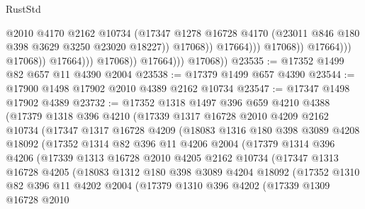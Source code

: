 \begin{lexlean}{RustStd}
\begin{coremodule}
                                                @2010
                                                @4170
                                                @2162
                                                @10734
                                                (@17347
                                                  @1278
                                                  @16728
                                                  @4170
                                                  (@23011 @846 @180 @398 @3629 @3250 @23020 @18227))
                                                @17068))
                                            @17664)))
                                      @17068))
                                  @17664)))
                            @17068))
                        @17664)))
                  @17068))
              @17664)))
        @17068))
@23535 := @17352 @1499 @82 @657 @11 @4390 @2004
@23538 := @17379 @1499 @657 @4390
@23544 := @17900 @1498 @17902 @2010 @4389 @2162 @10734
@23547 := @17347 @1498 @17902 @4389
@23732 := @17352
    @1318
    @1497
    @396
    @659
    @4210
    @4388
    (@17379
      @1318
      @396
      @4210
      (@17339
        @1317
        @16728
        @2010
        @4209
        @2162
        @10734
        (@17347
          @1317
          @16728
          @4209
          (@18083
            @1316
            @180
            @398
            @3089
            @4208
            @18092
            (@17352
              @1314
              @82
              @396
              @11
              @4206
              @2004
              (@17379
                @1314
                @396
                @4206
                (@17339
                  @1313
                  @16728
                  @2010
                  @4205
                  @2162
                  @10734
                  (@17347
                    @1313
                    @16728
                    @4205
                    (@18083
                      @1312
                      @180
                      @398
                      @3089
                      @4204
                      @18092
                      (@17352
                        @1310
                        @82
                        @396
                        @11
                        @4202
                        @2004
                        (@17379
                          @1310
                          @396
                          @4202
                          (@17339
                            @1309
                            @16728
                            @2010

\end{coremodule}
\end{lexlean}
